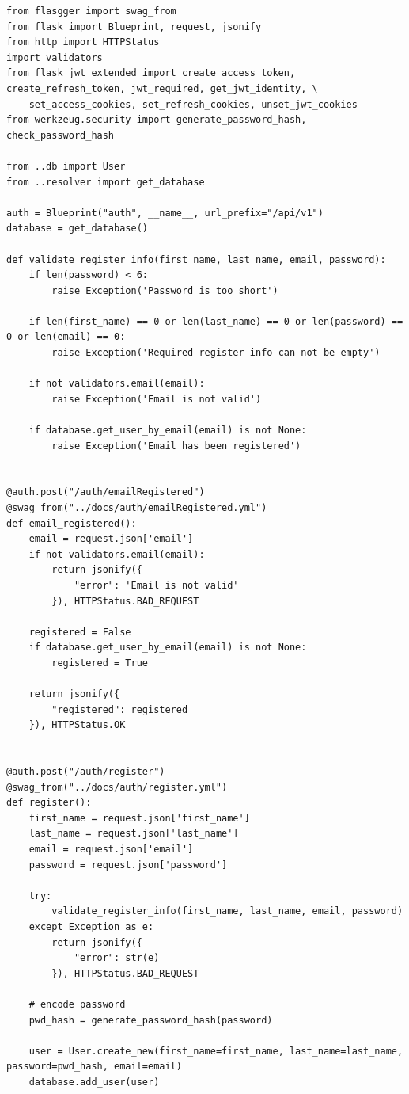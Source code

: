 \documentclass[12pt, letterpaper]{article}
\begin{document}
\begin{verbatim}
from flasgger import swag_from
from flask import Blueprint, request, jsonify
from http import HTTPStatus
import validators
from flask_jwt_extended import create_access_token, create_refresh_token, jwt_required, get_jwt_identity, \
    set_access_cookies, set_refresh_cookies, unset_jwt_cookies
from werkzeug.security import generate_password_hash, check_password_hash

from ..db import User
from ..resolver import get_database

auth = Blueprint("auth", __name__, url_prefix="/api/v1")
database = get_database()

def validate_register_info(first_name, last_name, email, password):
    if len(password) < 6:
        raise Exception('Password is too short')

    if len(first_name) == 0 or len(last_name) == 0 or len(password) == 0 or len(email) == 0:
        raise Exception('Required register info can not be empty')

    if not validators.email(email):
        raise Exception('Email is not valid')

    if database.get_user_by_email(email) is not None:
        raise Exception('Email has been registered')


@auth.post("/auth/emailRegistered")
@swag_from("../docs/auth/emailRegistered.yml")
def email_registered():
    email = request.json['email']
    if not validators.email(email):
        return jsonify({
            "error": 'Email is not valid'
        }), HTTPStatus.BAD_REQUEST

    registered = False
    if database.get_user_by_email(email) is not None:
        registered = True

    return jsonify({
        "registered": registered
    }), HTTPStatus.OK


@auth.post("/auth/register")
@swag_from("../docs/auth/register.yml")
def register():
    first_name = request.json['first_name']
    last_name = request.json['last_name']
    email = request.json['email']
    password = request.json['password']

    try:
        validate_register_info(first_name, last_name, email, password)
    except Exception as e:
        return jsonify({
            "error": str(e)
        }), HTTPStatus.BAD_REQUEST

    # encode password
    pwd_hash = generate_password_hash(password)

    user = User.create_new(first_name=first_name, last_name=last_name, password=pwd_hash, email=email)
    database.add_user(user)


\end{verbatim}
\end{document}

